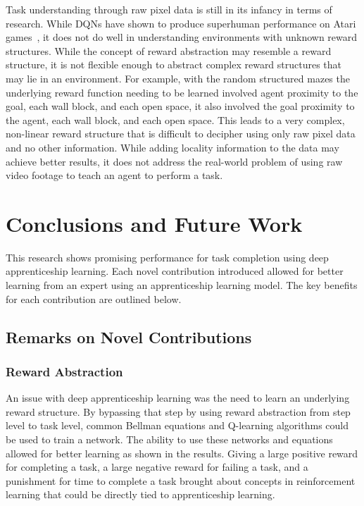 \documentclass[12pt,american]{report}
\begin{document}
Task understanding through raw pixel data is still in its infancy in terms of research.  While DQNs have shown to produce superhuman performance on Atari games~\cite{atari}, it does not do well in understanding environments with unknown reward structures.  While the concept of reward abstraction may resemble a reward structure, it is not flexible enough to abstract complex reward structures that may lie in an environment.  For example, with the random structured mazes the underlying reward function needing to be learned involved agent proximity to the goal, each wall block, and each open space, it also involved the goal proximity to the agent, each wall block, and each open space.  This leads to a very complex, non-linear reward structure that is difficult to decipher using only raw pixel data and no other information.  While adding locality information to the data may achieve better results, it does not address the real-world problem of using raw video footage to teach an agent to perform a task. 


\chapter{Conclusions and Future Work}
\label{sec:conclusions}
This research shows promising performance for task completion using deep apprenticeship learning.  Each novel contribution introduced allowed for better learning from an expert using an apprenticeship learning model.  The key benefits for each contribution are outlined below. 
\section{Remarks on Novel Contributions}
\subsection{Reward Abstraction}
An issue with deep apprenticeship learning was the need to learn an underlying reward structure.  By bypassing that step by using reward abstraction from step level to task level, common Bellman equations and Q-learning algorithms could be used to train a network.  The ability to use these networks and equations allowed for better learning as shown in the results.  Giving a large positive reward for completing a task, a large negative reward for failing a task, and a punishment for time to complete a task brought about concepts in reinforcement learning that could be directly tied to apprenticeship learning.
\end{document}

